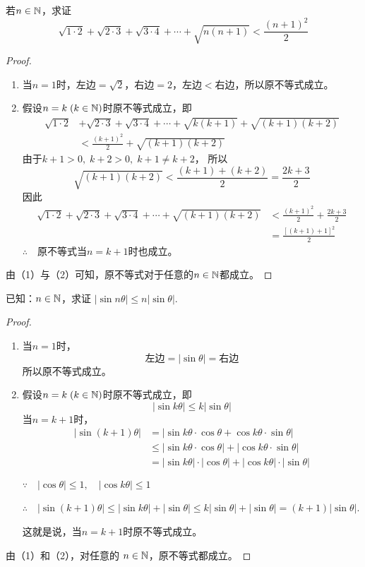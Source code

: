 \begin{example}
若$n\in\mathbb{N}$，求证
\[\sqrt{1\cdot 2}+\sqrt{2\cdot 3}+\sqrt{3\cdot 4}+\cdots +\sqrt{n(n+1)}<\frac{(n+1)^2}{2}\]
\end{example}

\begin{proof}
\begin{enumerate}[(1)]
    \item 当$n=1$时，左边$=\sqrt{2}$，右边$=2$，左边$<$右边，所以原不等式成立。
    \item 假设$n=k\; (k\in\mathbb{N})$时原不等式成立，即
\[\begin{split}
   \sqrt{1\cdot 2}&+\sqrt{2\cdot 3}+\sqrt{3\cdot 4}+\cdots +\sqrt{k(k+1)}+\sqrt{(k+1)(k+2)}\\
    &   <\frac{(k+1)^2}{2}+\sqrt{(k+1)(k+2)}
\end{split}\]
由于$k+1>0,\; k+2>0,\; k+1\ne k+2$，
所以
\[\sqrt{(k+1)(k+2)}<\frac{(k+1)+(k+2)}{2}=\frac{2k+3}{2}\]
因此 
\[\begin{split}
    \sqrt{1\cdot 2}+\sqrt{2\cdot 3}+\sqrt{3\cdot 4}+\cdots +\sqrt{(k+1)(k+2)}&<\frac{(k+1)^2}{2}+\frac{2k+3}{2}\\
    &=\frac{[(k+1)+1]^2}{2}
\end{split}\]
$\therefore\quad $原不等式当$n=k+1$时也成立。
\end{enumerate} 

由（1）与（2）可知，原不等式对于任意的$n\in\mathbb{N}$都成立。
\end{proof}






\begin{example}
     已知：$n\in\mathbb{N}$，求证
$|\sin n\theta|\le n|\sin\theta|$.
\end{example}

\begin{proof}
\begin{enumerate}[(1)]
    \item 当$n=1$时，
\[\text{左边}=|\sin\theta|=\text{右边}\]
所以原不等式成立。
\item 假设$n=k\; (k\in\mathbb{N})$时原不等式成立，即
\[|\sin k\theta|\le k|\sin\theta|\]
当$n=k+1$时，
\[\begin{split}
|\sin(k+1)\theta|&=|\sin k\theta\cdot \cos\theta+\cos k\theta\cdot \sin\theta|\\
&\le |\sin k\theta\cdot \cos\theta| +|\cos k\theta\cdot \sin\theta|\\
&=|\sin k\theta|\cdot |\cos\theta| + |\cos k\theta|\cdot |\sin\theta|    
\end{split}\]

$\because\quad |\cos\theta|\le 1,\quad |\cos k\theta|\le 1$

$\therefore\quad |\sin(k+1)\theta|\le |\sin k\theta|+|\sin\theta|\le k|\sin\theta|+|\sin\theta|=(k+1)|\sin\theta|$.

这就是说，当$n=k+1$时原不等式成立。
\end{enumerate}

由（1）和（2），对任意的
$n\in\mathbb{N}$，原不等式都成立。
\end{proof}

